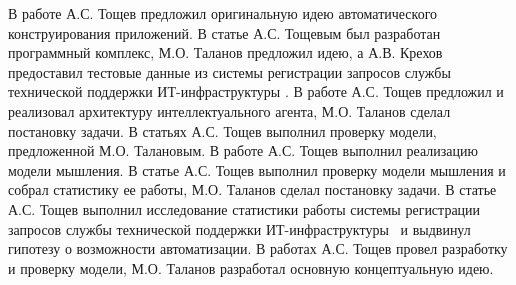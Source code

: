 В работе  \cite{Lobachevskii} А.С. Тощев предложил оригинальную идею автоматического конструирования приложений. В статье \cite{WCIT-2012} А.С. Тощевым был разработан программный комплекс, М.О. Таланов предложил идею, а А.В. Крехов предоставил тестовые данные из системы регистрации запросов службы технической поддержки ИТ-инфраструктуры \icl. В работе \cite{ISGZ} А.С. Тощев предложил и реализовал архитектуру интеллектуального агента, М.О. Таланов сделал постановку задачи. В статьях \cite{IJSE-1, IJSE-2} А.С. Тощев выполнил проверку модели, предложенной М.О. Талановым. В работе \cite{RCDL-2014} А.С. Тощев выполнил реализацию модели мышления. В статье \cite{ AMSTA-2015} А.С. Тощев выполнил проверку модели мышления и собрал статистику ее работы, М.О. Таланов сделал постановку задачи. В статье \cite{VAK-1} А.С. Тощев выполнил исследование статистики работы системы регистрации запросов службы технической поддержки ИТ-инфраструктуры \icl\ и выдвинул гипотезу о возможности автоматизации. В работах \cite{EB-1, EB-2} А.С. Тощев провел разработку и проверку модели, М.О. Таланов разработал основную концептуальную идею. \par


